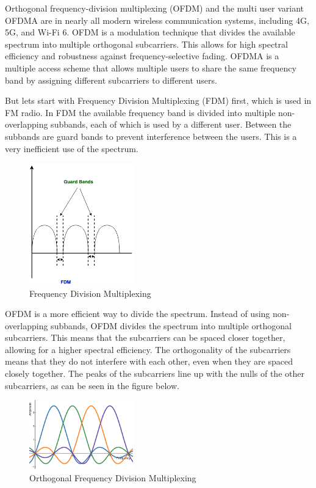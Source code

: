 Orthogonal frequency-division multiplexing (OFDM) and the multi user variant OFDMA are in nearly all modern wireless communication systems, including 4G, 5G, and Wi-Fi 6. OFDM is a modulation technique that divides the available spectrum into multiple orthogonal subcarriers. This allows for high spectral efficiency and robustness against frequency-selective fading. OFDMA is a multiple access scheme that allows multiple users to share the same frequency band by assigning different subcarriers to different users.

But lets start with Frequency Division Multiplexing (FDM) first, which is used in FM radio. In FDM the available frequency band is divided into multiple non-overlapping subbands, each of which is used by a different user. Between the subbands are guard bands to prevent interference between the users. This is a very inefficient use of the spectrum.

\begin{figure}[H]
	\centering
	\includegraphics[width=0.4\textwidth]{Figures/fdm.png}
	\caption{Frequency Division Multiplexing}
\end{figure}

OFDM is a more efficient way to divide the spectrum. Instead of using non-overlapping subbands, OFDM divides the spectrum into multiple orthogonal subcarriers. This means that the subcarriers can be spaced closer together, allowing for a higher spectral efficiency. The orthogonality of the subcarriers means that they do not interfere with each other, even when they are spaced closely together. The peaks of the subcarriers line up with the nulls of the other subcarriers, as can be seen in the figure below.

\begin{figure}[H]
	\centering
	\includegraphics[width=0.4\textwidth]{Figures/ofdm.png}
	\caption{Orthogonal Frequency Division Multiplexing}
\end{figure}